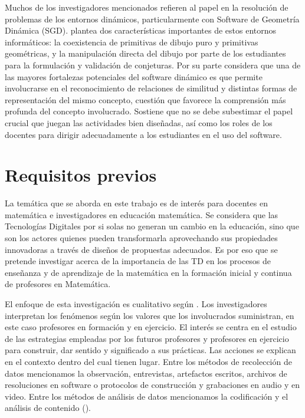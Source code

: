 \documentclass[oneside,spanish]{amsart}
\numberwithin{equation}{section}
\numberwithin{figure}{section}
\theoremstyle{definition}
\begin{document}
Muchos de los investigadores mencionados refieren al papel en la resolución de problemas de los entornos dinámicos, particularmente con Software de Geometría Dinámica (SGD). \citet{laborde15} plantea dos características importantes de estos entornos informáticos: la coexistencia de primitivas de dibujo puro y primitivas geométricas, y la manipulación directa del dibujo por parte de los estudiantes para la formulación y validación de conjeturas. Por su parte \citet{shahmohammadi19} considera que una de las mayores fortalezas potenciales del software dinámico es que permite involucrarse en el reconocimiento de relaciones de similitud y distintas formas de representación del mismo concepto, cuestión que favorece la comprensión más profunda del concepto involucrado. Sostiene que no se debe subestimar el papel crucial que juegan las actividades bien diseñadas, así como los roles de los docentes para dirigir adecuadamente a los estudiantes en el uso del software.

\section{Requisitos previos}

La temática que se aborda en este trabajo es de interés para docentes en matemática e investigadores en educación matemática. Se considera que las Tecnologías Digitales por si solas no generan un cambio en la educación, sino que son los actores quienes pueden transformarla aprovechando sus propiedades innovadoras a través de diseños de propuestas adecuados. Es por eso que se pretende investigar acerca de la importancia de las TD en los procesos de enseñanza y de aprendizaje de la matemática en la formación inicial y continua de profesores en Matemática. 

El enfoque de esta investigación es cualitativo según \citet{mcmillan05}. Los investigadores interpretan los fenómenos según los valores que los involucrados suministran, en este caso profesores en formación y en ejercicio. El interés se centra en el estudio de las estrategias empleadas por los futuros profesores y profesores en ejercicio para construir, dar sentido y significado a sus prácticas. Las acciones se explican en el contexto dentro del cual tienen lugar. Entre los métodos de recolección de datos mencionamos la observación, entrevistas, artefactos escritos, archivos de resoluciones en software o protocolos de construcción y grabaciones en audio y en video. Entre los métodos de análisis de datos mencionamos la codificación y el análisis de contenido (\citet{mcknight00}).
\end{document}
